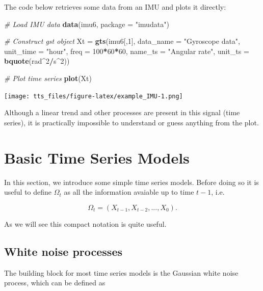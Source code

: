 \documentclass[]{book}
\newenvironment{Shaded}{\begin{snugshade}}{\end{snugshade}}
\newcommand{\CommentTok}[1]{\textcolor[rgb]{0.56,0.35,0.01}{\textit{#1}}}
\newcommand{\DataTypeTok}[1]{\textcolor[rgb]{0.13,0.29,0.53}{#1}}
\newcommand{\DecValTok}[1]{\textcolor[rgb]{0.00,0.00,0.81}{#1}}
\newcommand{\KeywordTok}[1]{\textcolor[rgb]{0.13,0.29,0.53}{\textbf{#1}}}
\newcommand{\NormalTok}[1]{#1}
\newcommand{\OperatorTok}[1]{\textcolor[rgb]{0.81,0.36,0.00}{\textbf{#1}}}
\newcommand{\StringTok}[1]{\textcolor[rgb]{0.31,0.60,0.02}{#1}}
\theoremstyle{definition}
\theoremstyle{definition}
\theoremstyle{definition}
\theoremstyle{remark}
\begin{document}
The code below retrieves some data from an IMU and plots it directly:

\begin{Shaded}
\begin{Highlighting}[]
\CommentTok{# Load IMU data}
\KeywordTok{data}\NormalTok{(imu6, }\DataTypeTok{package =} \StringTok{"imudata"}\NormalTok{)}

\CommentTok{# Construct gst object}
\NormalTok{Xt =}\StringTok{ }\KeywordTok{gts}\NormalTok{(imu6[,}\DecValTok{1}\NormalTok{], }\DataTypeTok{data_name =} \StringTok{"Gyroscope data"}\NormalTok{, }\DataTypeTok{unit_time =} \StringTok{"hour"}\NormalTok{, }
         \DataTypeTok{freq =} \DecValTok{100}\OperatorTok{*}\DecValTok{60}\OperatorTok{*}\DecValTok{60}\NormalTok{, }\DataTypeTok{name_ts =} \StringTok{"Angular rate"}\NormalTok{, }
         \DataTypeTok{unit_ts =} \KeywordTok{bquote}\NormalTok{(rad}\OperatorTok{^}\DecValTok{2}\OperatorTok{/}\NormalTok{s}\OperatorTok{^}\DecValTok{2}\NormalTok{))}

\CommentTok{# Plot time series}
\KeywordTok{plot}\NormalTok{(Xt)}
\end{Highlighting}
\end{Shaded}

\texttt{[image: tts\_files/figure-latex/example\_IMU-1.png]}

Although a linear trend and other processes are present in this signal
(time series), it is practically impossible to understand or guess
anything from the plot.

\hypertarget{basicmodels}{%
\section{Basic Time Series Models}\label{basicmodels}}

In this section, we introduce some simple time series models. Before
doing so it is useful to define \(\Omega_t\) as all the information
avaiable up to time \(t-1\), i.e.

\[\Omega_t = \left(X_{t-1}, X_{t-2}, ..., X_0 \right).\]

As we will see this compact notation is quite useful.

\hypertarget{wn}{%
\subsection{White noise processes}\label{wn}}

The building block for most time series models is the Gaussian white
noise process, which can be defined as
\end{document}
